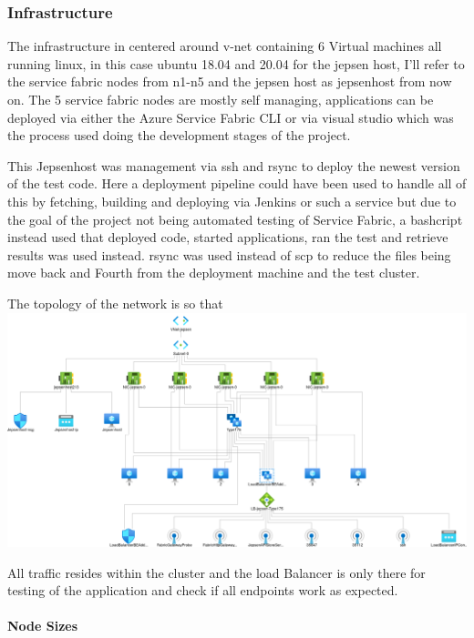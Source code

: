 \documentclass[a4paper,10pt,titlepage]{report}
\begin{document}
\subsubsection{Infrastructure}
The infrastructure in centered around v-net containing 6 Virtual machines all running linux, in this case ubuntu 18.04 and 20.04 for the jepsen host, I'll refer to the service fabric nodes from n1-n5 and the jepsen host as jepsenhost from now on.
The 5 service fabric nodes are mostly self managing, applications can be deployed via either the Azure Service Fabric CLI\cite{https://docs.microsoft.com/en-us/azure/service-fabric/service-fabric-cli} or via visual studio\cite{https://docs.microsoft.com/en-us/azure/service-fabric/service-fabric-tutorial-deploy-app-to-party-cluster} which was the process used doing the development stages of the project.

This Jepsenhost was management via ssh and rsync to deploy the newest version of the test code. Here a deployment pipeline could have been used to handle all of this by fetching, building and deploying via Jenkins or such a service but due to the goal of the project not being automated testing of Service Fabric, a bashcript instead used that deployed code, started applications, ran the test and retrieve results was used instead. rsync was used instead of scp to reduce the files being move back and Fourth from the deployment machine and the test cluster. 

The topology of the network is so that \\
\includegraphics[scale=0.3]{images/topology.png}

All traffic resides within the cluster and the load Balancer is only there for testing of the application and check if all endpoints work as expected.

\paragraph*{Node Sizes}
\end{document}
